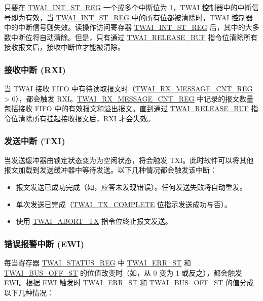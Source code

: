 \documentclass[main\_\_CN.tex]{subfiles}
\begin{document}
只要在 \hyperref[regdesc:TWAIINTSTREG]{TWAI\_INT\_ST\_REG} 一个或多个中断位为 1，TWAI 控制器中的中断信号即为有效，当 \hyperref[regdesc:TWAIINTSTREG]{TWAI\_INT\_ST\_REG} 中的所有位都被清除时，TWAI 控制器中的中断信号则失效。读操作访问寄存器 \hyperref[regdesc:TWAIINTSTREG]{TWAI\_INT\_ST\_REG} 后，其中的大多数中断位将自动清除。但是，只有通过 \hyperref[fielddesc:TWAIRELEASEBUF]{TWAI\_RELEASE\_BUF} 指令位清除所有接收报文后，接收中断位才能被清除。

\subsubsection{接收中断 (RXI)}
\label{other:twai-para-rxi}
当 TWAI 接收 FIFO 中有待读取报文时（\hyperref[regdesc:TWAIRXMESSAGECNTREG]{TWAI\_RX\_MESSAGE\_CNT\_REG} > 0），都会触发 RXI。\hyperref[regdesc:TWAIRXMESSAGECNTREG]{TWAI\_RX\_MESSAGE\_CNT\_REG} 中记录的报文数量包括接收 FIFO 中的有效报文和溢出报文。直到通过 \hyperref[fielddesc:TWAIRELEASEBUF]{TWAI\_RELEASE\_BUF} 指令位清除所有挂起接收报文后，RXI 才会失效。

\subsubsection{发送中断 (TXI)}
\label{other:twai-para-txi}
当发送缓冲器由锁定状态变为为空闲状态，将会触发 TXI。此时软件可以将其他报文加载到发送缓冲器中等待发送。以下几种情况都会触发该中断： 

\begin{itemize}
    \item 报文发送已成功完成（如，应答未发现错误）。任何发送失败将自动重发。
    \item 单次发送已完成（\hyperref[fielddesc:TWAITXCOMPLETE]{TWAI\_TX\_COMPLETE} 位指示发送成功与否）。
    \item 使用 \hyperref[fielddesc:TWAIABORTTX]{TWAI\_ABORT\_TX} 指令位终止报文发送。
\end{itemize}

\subsubsection{错误报警中断 (EWI)}
\label{other:twai-para-ewi}
每当寄存器 \hyperref[regdesc:TWAISTATUSREG]{TWAI\_STATUS\_REG} 中 \hyperref[fielddesc:TWAIERRST]{TWAI\_ERR\_ST} 和 \hyperref[fielddesc:TWAIBUSOFFST]{TWAI\_BUS\_OFF\_ST} 的位值改变时（如，从 0 变为 1 或反之），都会触发 EWI。根据 EWI 触发时 \hyperref[fielddesc:TWAIERRST]{TWAI\_ERR\_ST} 和 \hyperref[fielddesc:TWAIBUSOFFST]{TWAI\_BUS\_OFF\_ST} 的值分成以下几种情况：
\end{document}
